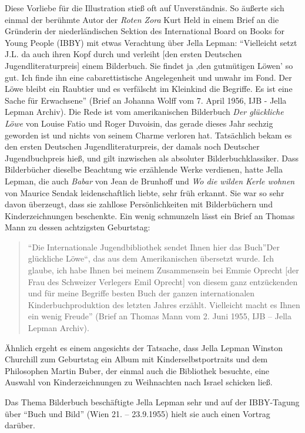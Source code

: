 \documentclass[a4paper,
fontsize=11pt,
oneside,
numbers=noperiodatend,
parskip=half-,
bibliography=totoc,
final
]{scrartcl}
\begin{document}
Diese Vorliebe für die Illustration stieß oft auf Unverständnis. So
äußerte sich einmal der berühmte Autor der \emph{Roten Zora} Kurt Held
in einem Brief an die Gründerin der niederländischen Sektion des
International Board on Books for Young People (IBBY) mit etwas
Verachtung über Jella Lepman: \enquote{Vielleicht setzt J.L. da auch
ihren Kopf durch und verleiht {[}den ersten Deutschen
Jugendliteraturpreis{]} einem Bilderbuch. Sie findet ja ‚den gutmütigen
Löwen' so gut. Ich finde ihn eine cabarettistische Angelegenheit und
unwahr im Fond. Der Löwe bleibt ein Raubtier und es verfälscht im
Kleinkind die Begriffe. Es ist eine Sache für Erwachsene} (Brief an
Johanna Wolff vom 7. April 1956, IJB - Jella Lepman Archiv). Die Rede
ist vom amerikanischen Bilderbuch \emph{Der glückliche Löwe} von Louise
Fatio und Roger Duvoisin, das gerade dieses Jahr sechzig geworden ist
und nichts von seinem Charme verloren hat. Tatsächlich bekam es den
ersten Deutschen Jugendliteraturpreis, der damals noch Deutscher
Jugendbuchpreis hieß, und gilt inzwischen als absoluter
Bilderbuchklassiker. Dass Bilderbücher dieselbe Beachtung wie erzählende
Werke verdienen, hatte Jella Lepman, die auch \emph{Babar} von Jean de
Brunhoff und \emph{Wo die wilden Kerle wohnen} von Maurice Sendak
leidenschaftlich liebte, sehr früh erkannt. Sie war so sehr davon
überzeugt, dass sie zahllose Persönlichkeiten mit Bilderbüchern und
Kinderzeichnungen beschenkte. Ein wenig schmunzeln lässt ein Brief an
Thomas Mann zu dessen achtzigsten Geburtstag:~

\begin{quote}
\enquote{Die Internationale Jugendbibliothek sendet Ihnen hier das
Buch}Der glückliche Löwe\enquote{, das aus dem Amerikanischen übersetzt
wurde. Ich glaube, ich habe Ihnen bei meinem Zusammensein bei Emmie
Oprecht {[}der Frau des Schweizer Verlegers Emil Oprecht{]} von diesem
ganz entzückenden und für meine Begriffe besten Buch der ganzen
internationalen Kinderbuchproduktion des letzten Jahres erzählt.
Vielleicht macht es Ihnen ein wenig Freude} (Brief an Thomas Mann vom 2.
Juni 1955, IJB -- Jella Lepman Archiv).~
\end{quote}

Ähnlich ergeht es einem angesichts der Tatsache, dass Jella Lepman
Winston Churchill zum Geburtstag ein Album mit Kinderselbstportraits und
dem Philosophen Martin Buber, der einmal auch die Bibliothek besuchte,
eine Auswahl von Kinderzeichnungen zu Weihnachten nach Israel schicken
ließ.~

Das Thema Bilderbuch beschäftigte Jella Lepman sehr und auf der
IBBY-Tagung über \enquote{Buch und Bild} (Wien 21. -- 23.9.1955) hielt
sie auch einen Vortrag darüber.
\end{document}
